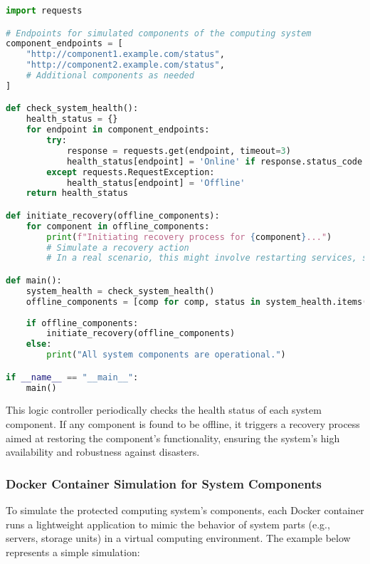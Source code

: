 \documentclass[12pt]{article}
\begin{document}
\begin{lstlisting}[language=Python, caption=HA/Load Balance Logic Controller for Disaster Recovery]
import requests

# Endpoints for simulated components of the computing system
component_endpoints = [
    "http://component1.example.com/status",
    "http://component2.example.com/status",
    # Additional components as needed
]

def check_system_health():
    health_status = {}
    for endpoint in component_endpoints:
        try:
            response = requests.get(endpoint, timeout=3)
            health_status[endpoint] = 'Online' if response.status_code == 200 else 'Offline'
        except requests.RequestException:
            health_status[endpoint] = 'Offline'
    return health_status

def initiate_recovery(offline_components):
    for component in offline_components:
        print(f"Initiating recovery process for {component}...")
        # Simulate a recovery action
        # In a real scenario, this might involve restarting services, switching to backup systems, etc.

def main():
    system_health = check_system_health()
    offline_components = [comp for comp, status in system_health.items() if status == 'Offline']
    
    if offline_components:
        initiate_recovery(offline_components)
    else:
        print("All system components are operational.")

if __name__ == "__main__":
    main()
\end{lstlisting}

This logic controller periodically checks the health status of each system component. If any component is found to be offline, it triggers a recovery process aimed at restoring the component's functionality, ensuring the system's high availability and robustness against disasters.

\subsubsection{Docker Container Simulation for System Components}

To simulate the protected computing system's components, each Docker container runs a lightweight application to mimic the behavior of system parts (e.g., servers, storage units) in a virtual computing environment. The example below represents a simple simulation:
\end{document}
